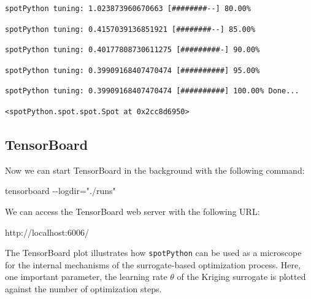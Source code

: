 \documentclass[
  letterpaper,
  DIV=11,
  numbers=noendperiod]{scrreprt}
\newenvironment{Shaded}{\begin{snugshade}}{\end{snugshade}}
\newcommand{\NormalTok}[1]{\textcolor[rgb]{0.00,0.23,0.31}{#1}}
\begin{document}
\begin{verbatim}
spotPython tuning: 1.023873960670663 [########--] 80.00% 
\end{verbatim}

\begin{verbatim}
spotPython tuning: 0.4157039136851921 [########--] 85.00% 
\end{verbatim}

\begin{verbatim}
spotPython tuning: 0.40177808730611275 [#########-] 90.00% 
\end{verbatim}

\begin{verbatim}
spotPython tuning: 0.39909168407470474 [##########] 95.00% 
\end{verbatim}

\begin{verbatim}
spotPython tuning: 0.39909168407470474 [##########] 100.00% Done...
\end{verbatim}

\begin{verbatim}
<spotPython.spot.spot.Spot at 0x2cc8d6950>
\end{verbatim}

\hypertarget{tensorboard-7}{%
\subsection{TensorBoard}\label{tensorboard-7}}

Now we can start TensorBoard in the background with the following
command:

\begin{Shaded}
\begin{Highlighting}[]
\NormalTok{tensorboard {-}{-}logdir="./runs"}
\end{Highlighting}
\end{Shaded}

We can access the TensorBoard web server with the following URL:

\begin{Shaded}
\begin{Highlighting}[]
\NormalTok{http://localhost:6006/}
\end{Highlighting}
\end{Shaded}

The TensorBoard plot illustrates how \texttt{spotPython} can be used as
a microscope for the internal mechanisms of the surrogate-based
optimization process. Here, one important parameter, the learning rate
\(\theta\) of the Kriging surrogate is plotted against the number of
optimization steps.
\end{document}
